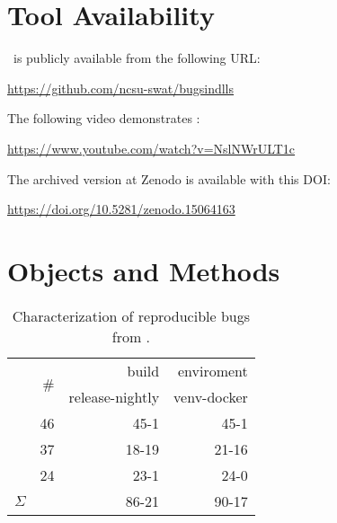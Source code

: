 \documentclass[sigconf,screen]{acmart}
\begin{document}

\section{Tool Availability}
\label{sec:tool-availability}
\tname\ is publicly available from the following URL:

\url{https://github.com/ncsu-swat/bugsindlls}

\vspace{0.5ex}\noindent{}The following video demonstrates \tname:

\url{https://www.youtube.com/watch?v=NslNWrULT1c}

\vspace{0.5ex}\noindent{}The archived version at Zenodo is available with this DOI:

\url{https://doi.org/10.5281/zenodo.15064163}\\


\section{Objects and Methods}

\begin{table}
  \centering
  \caption{\label{table:bug-characterization}Characterization of
    reproducible bugs from \tname.}
\begin{tabular}{l|rrr}
  \toprule & \multirow{2}{*}{\#} & \multicolumn{1}{r}{build} &
  \multicolumn{1}{r}{enviroment} \\ & & release-nightly & venv-docker
  \\ \cmidrule(lr){2-4} \jax{} & 46 & 45-1 & 45-1 \\ \torch{} & 37 &
  18-19 & 21-16 \\ \tf{} & 24 & 23-1 & 24-0 \\ \midrule
  \multicolumn{1}{c|}{$\Sigma$} & \numbugs{} & 86-21& 90-17
  \\ \bottomrule
\end{tabular}
\end{table}
\end{document}

